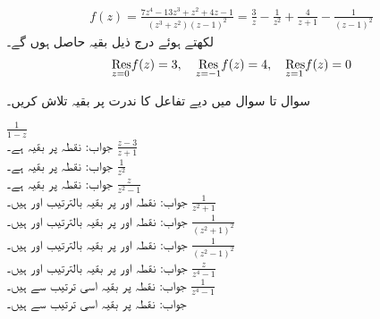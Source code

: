 \quad
\begin{align*}
f(z)=\frac{7z^4-13z^3+z^2+4z-1}{(z^3+z^2)(z-1)^2}=\frac{3}{z}-\frac{1}{z^2}+\frac{4}{z+1}-\frac{1}{(z-1)^2}
\end{align*}
لکھتے ہوئے درج ذیل بقیہ حاصل ہوں گے۔
\begin{align*}
\underset{z=0\hfill}{\Res} f(z)=3,\quad \underset{z=-1\hfill}{\Res} f(z)=4,\quad \underset{z=1\hfill}{\Res} f(z)=0
\end{align*}

سوال  تا سوال  میں دیے تفاعل کا ندرت پر بقیہ تلاش کریں۔

\quad
$\tfrac{1}{1-z}$\\
جواب:\quad
نقطہ  پر بقیہ  ہے۔
\quad
$\tfrac{z-3}{z+1}$\\
جواب:\quad
نقطہ  پر بقیہ  ہے۔
\quad
$\tfrac{1}{z^2}$\\
جواب:\quad
نقطہ  پر بقیہ  ہے۔
\quad
$\tfrac{z}{z^2-1}$\\
جواب:\quad
نقطہ  اور  پر بقیہ بالترتیب   اور  ہیں۔
\quad
$\tfrac{1}{z^2+1}$\\
جواب:\quad
نقطہ  اور  پر بقیہ بالترتیب   اور  ہیں۔
\quad
$\tfrac{1}{(z^2+1)^2}$\\
جواب:\quad
نقطہ  اور  پر بقیہ بالترتیب   اور  ہیں۔
\quad
$\tfrac{1}{(z^2-1)^2}$\\
جواب:\quad
نقطہ  اور  پر بقیہ بالترتیب   اور  ہیں۔
\quad
$\tfrac{z}{z^4-1}$\\
جواب:\quad
نقطہ  پر بقیہ اسی ترتیب سے   ہیں۔
\quad
$\tfrac{1}{z^4-1}$\\
جواب:\quad
نقطہ  پر بقیہ اسی ترتیب سے   ہیں۔
